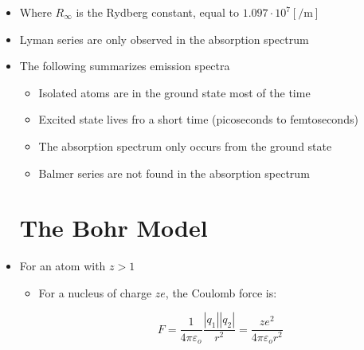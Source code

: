\begin{itemize}
  \item Where $R_{\infty}$ is the Rydberg constant, equal to $1.097\cdot10^7 [\si{\per\meter}]$

  \item Lyman series are only observed in the absorption spectrum

  \item The following summarizes emission spectra

    \begin{itemize}

      \item Isolated atoms are in the ground state most of the time

      \item Excited state lives fro a short time (picoseconds to femtoseconds)

      \item The absorption spectrum only occurs from the ground state

      \item Balmer series are not found in the absorption spectrum

    \end{itemize}

    \section{The Bohr Model}

  \item For an atom with $z>1$

    \begin{itemize}

      \item For a nucleus of charge $ze$, the Coulomb force is:

        $$F=\frac{1}{4\pi\varepsilon_o}\frac{|q_1||q_2|}{r^2}=\frac{ze^2}{4\pi\varepsilon_o r^2}$$

    \end{itemize}

  \end{itemize}



